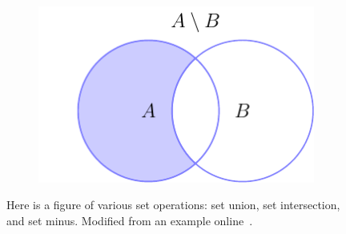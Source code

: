 \begin{figure}[t]
    \begin{subfigure}[t]{0.45\textwidth}
    \includegraphics[width=\textwidth]{figures/math/set_theory/set_venn_minus.pdf}
    \end{subfigure}
    \caption[Set operations]{Here is a figure of various set operations:
        set union, set intersection, and set minus.
        Modified from an example online~\cite{vennDiagram}.}
    \label{fig:math_set_venn}
\end{figure}
